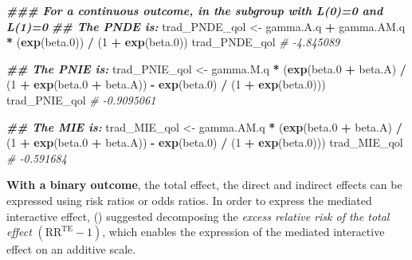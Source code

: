 \documentclass[
]{book}
\newenvironment{Shaded}{\begin{snugshade}}{\end{snugshade}}
\newcommand{\CommentTok}[1]{\textcolor[rgb]{0.56,0.35,0.01}{\textit{#1}}}
\newcommand{\DecValTok}[1]{\textcolor[rgb]{0.00,0.00,0.81}{#1}}
\newcommand{\DocumentationTok}[1]{\textcolor[rgb]{0.56,0.35,0.01}{\textbf{\textit{#1}}}}
\newcommand{\FloatTok}[1]{\textcolor[rgb]{0.00,0.00,0.81}{#1}}
\newcommand{\FunctionTok}[1]{\textcolor[rgb]{0.13,0.29,0.53}{\textbf{#1}}}
\newcommand{\NormalTok}[1]{#1}
\newcommand{\OtherTok}[1]{\textcolor[rgb]{0.56,0.35,0.01}{#1}}
\newcommand{\SpecialCharTok}[1]{\textcolor[rgb]{0.81,0.36,0.00}{\textbf{#1}}}
\begin{document}
\begin{Shaded}
\begin{Highlighting}[]
\DocumentationTok{\#\#\# For a continuous outcome, in the subgroup with L(0)=0 and L(1)=0}
\DocumentationTok{\#\# The PNDE is:}
\NormalTok{trad\_PNDE\_qol }\OtherTok{\textless{}{-}}\NormalTok{ gamma.A.q }\SpecialCharTok{+}\NormalTok{ gamma.AM.q }\SpecialCharTok{*}\NormalTok{ (}\FunctionTok{exp}\NormalTok{(beta}\FloatTok{.0}\NormalTok{)) }\SpecialCharTok{/}\NormalTok{ (}\DecValTok{1} \SpecialCharTok{+} \FunctionTok{exp}\NormalTok{(beta}\FloatTok{.0}\NormalTok{))}
\NormalTok{trad\_PNDE\_qol}
\CommentTok{\# {-}4.845089}

\DocumentationTok{\#\# The PNIE is:}
\NormalTok{trad\_PNIE\_qol }\OtherTok{\textless{}{-}}\NormalTok{ gamma.M.q }\SpecialCharTok{*}
\NormalTok{  (}\FunctionTok{exp}\NormalTok{(beta}\FloatTok{.0} \SpecialCharTok{+}\NormalTok{ beta.A) }\SpecialCharTok{/}
\NormalTok{     (}\DecValTok{1} \SpecialCharTok{+} \FunctionTok{exp}\NormalTok{(beta}\FloatTok{.0} \SpecialCharTok{+}\NormalTok{ beta.A)) }\SpecialCharTok{{-}} \FunctionTok{exp}\NormalTok{(beta}\FloatTok{.0}\NormalTok{) }\SpecialCharTok{/}\NormalTok{ (}\DecValTok{1} \SpecialCharTok{+} \FunctionTok{exp}\NormalTok{(beta}\FloatTok{.0}\NormalTok{)))}
\NormalTok{trad\_PNIE\_qol}
\CommentTok{\# {-}0.9095061}

\DocumentationTok{\#\# The MIE is:}
\NormalTok{trad\_MIE\_qol }\OtherTok{\textless{}{-}}\NormalTok{ gamma.AM.q }\SpecialCharTok{*}
\NormalTok{  (}\FunctionTok{exp}\NormalTok{(beta}\FloatTok{.0} \SpecialCharTok{+}\NormalTok{ beta.A) }\SpecialCharTok{/}\NormalTok{ (}\DecValTok{1} \SpecialCharTok{+} \FunctionTok{exp}\NormalTok{(beta}\FloatTok{.0} \SpecialCharTok{+}\NormalTok{ beta.A)) }\SpecialCharTok{{-}}
     \FunctionTok{exp}\NormalTok{(beta}\FloatTok{.0}\NormalTok{) }\SpecialCharTok{/}\NormalTok{ (}\DecValTok{1} \SpecialCharTok{+} \FunctionTok{exp}\NormalTok{(beta}\FloatTok{.0}\NormalTok{)))}
\NormalTok{trad\_MIE\_qol}
\CommentTok{\# {-}0.591684}
\end{Highlighting}
\end{Shaded}

\textbf{With a binary outcome}, the total effect, the direct and indirect effects can be expressed using risk ratios or odds ratios. In order to express the mediated interactive effect, () suggested decomposing the \emph{excess relative risk of the total effect} \((\text{RR}^{\text{TE}}-1)\), which enables the expression of the mediated interactive effect on an additive scale.
\end{document}
